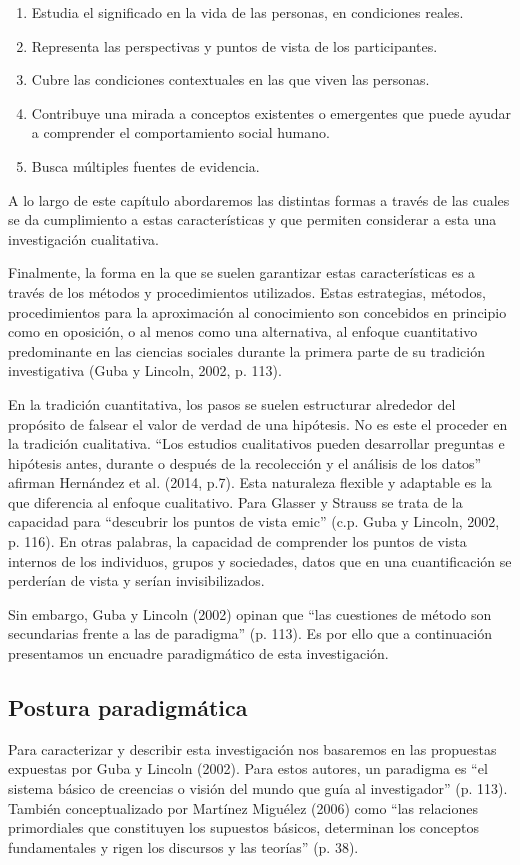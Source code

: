 \begin{enumerate}
    \item Estudia el significado en la vida de las personas, en condiciones
    reales.
    \item Representa las perspectivas y puntos de vista de los participantes.
    \item Cubre las condiciones contextuales en las que viven las personas.
    \item Contribuye una mirada a conceptos existentes o emergentes que puede
    ayudar a comprender el comportamiento social humano.
    \item Busca múltiples fuentes de evidencia.
\end{enumerate}

A lo largo de este capítulo abordaremos las distintas formas a través de las
cuales se da cumplimiento a estas características y que permiten considerar a
esta una investigación cualitativa.

Finalmente, la forma en la que se suelen garantizar estas características es a
través de los métodos y procedimientos utilizados.
Estas estrategias, métodos, procedimientos para la aproximación al conocimiento
son concebidos en principio como en oposición, o al menos como una alternativa,
al enfoque cuantitativo predominante en las ciencias sociales durante la primera
parte de su tradición investigativa (Guba y Lincoln, 2002, p. 113).

En la tradición cuantitativa, los pasos se suelen estructurar alrededor del
propósito de falsear el valor de verdad de una hipótesis.
No es este el proceder en la tradición cualitativa.
“Los estudios cualitativos pueden desarrollar preguntas e hipótesis antes,
durante o después de la recolección y el análisis de los datos” afirman
Hernández et al. (2014, p.7).
Esta naturaleza flexible y adaptable es la que diferencia al enfoque
cualitativo.
Para Glasser y Strauss se trata de la capacidad para “descubrir los puntos de
vista emic” (c.p. Guba y Lincoln, 2002, p. 116).
En otras palabras, la capacidad de comprender los puntos de vista internos de
los individuos, grupos y sociedades, datos que en una cuantificación se
perderían de vista y serían invisibilizados.

Sin embargo, Guba y Lincoln (2002) opinan que “las cuestiones de método son
secundarias frente a las de paradigma” (p. 113).
Es por ello que a continuación presentamos un encuadre paradigmático de esta
investigación.

\subsection{Postura paradigmática}
Para caracterizar y describir esta investigación nos basaremos en las propuestas
expuestas por Guba y Lincoln (2002).
Para estos autores, un paradigma es “el sistema básico de creencias o visión del
mundo que guía al investigador” (p. 113).
También conceptualizado por Martínez Miguélez (2006) como “las relaciones
primordiales que constituyen los supuestos básicos, determinan los conceptos
fundamentales y rigen los discursos y las teorías” (p. 38).

